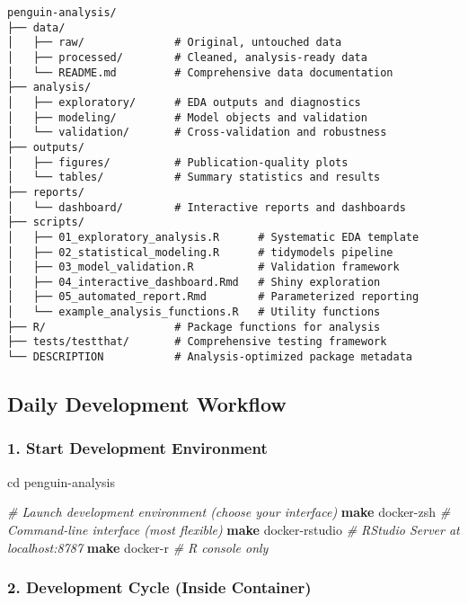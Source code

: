 \documentclass[
]{article}
\newenvironment{Shaded}{\begin{snugshade}}{\end{snugshade}}
\newcommand{\BuiltInTok}[1]{#1}
\newcommand{\CommentTok}[1]{\textcolor[rgb]{0.56,0.35,0.01}{\textit{#1}}}
\newcommand{\FunctionTok}[1]{\textcolor[rgb]{0.13,0.29,0.53}{\textbf{#1}}}
\newcommand{\NormalTok}[1]{#1}
\begin{document}
\begin{verbatim}
penguin-analysis/
├── data/
│   ├── raw/              # Original, untouched data
│   ├── processed/        # Cleaned, analysis-ready data
│   └── README.md         # Comprehensive data documentation
├── analysis/
│   ├── exploratory/      # EDA outputs and diagnostics
│   ├── modeling/         # Model objects and validation
│   └── validation/       # Cross-validation and robustness
├── outputs/
│   ├── figures/          # Publication-quality plots
│   └── tables/           # Summary statistics and results
├── reports/
│   └── dashboard/        # Interactive reports and dashboards
├── scripts/
│   ├── 01_exploratory_analysis.R      # Systematic EDA template
│   ├── 02_statistical_modeling.R      # tidymodels pipeline
│   ├── 03_model_validation.R          # Validation framework
│   ├── 04_interactive_dashboard.Rmd   # Shiny exploration
│   ├── 05_automated_report.Rmd        # Parameterized reporting
│   └── example_analysis_functions.R   # Utility functions
├── R/                    # Package functions for analysis
├── tests/testthat/       # Comprehensive testing framework
└── DESCRIPTION           # Analysis-optimized package metadata
\end{verbatim}

\subsection{Daily Development
Workflow}\label{daily-development-workflow}

\subsubsection{1. Start Development
Environment}\label{start-development-environment}

\begin{Shaded}
\begin{Highlighting}[]
\BuiltInTok{cd}\NormalTok{ penguin{-}analysis}

\CommentTok{\# Launch development environment (choose your interface)}
\FunctionTok{make}\NormalTok{ docker{-}zsh         }\CommentTok{\# Command{-}line interface (most flexible)}
\FunctionTok{make}\NormalTok{ docker{-}rstudio     }\CommentTok{\# RStudio Server at localhost:8787}
\FunctionTok{make}\NormalTok{ docker{-}r           }\CommentTok{\# R console only}
\end{Highlighting}
\end{Shaded}

\subsubsection{2. Development Cycle (Inside
Container)}\label{development-cycle-inside-container}
\end{document}

